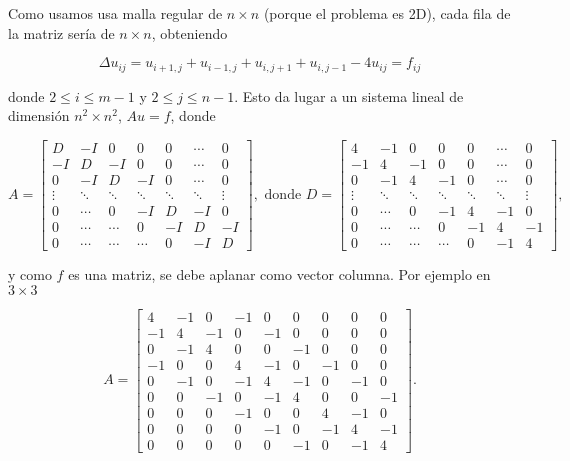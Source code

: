    Como usamos usa malla regular de $n \times n$ (porque el problema es  2D), cada fila de la matriz sería de $n\times n$, obteniendo

    \[
    \Delta u_{ij} =  u_{i+1, j} + u_{i-1, j} + u_{i, j+1} + u_{i, j-1} - 4 u_{ij} = f_{ij}
    \]

    donde \(2 \leq i \leq m-1\) y \(2 \leq j \leq n-1\). Esto da lugar a un sistema lineal de dimensión \(n^2 \times  n^2\),  $A u=f$, donde 

    $$
    A=\left[\begin{array}{ccccccc}
    D & -I & 0 & 0 & 0 & \cdots & 0 \\
    -I & D & -I & 0 & 0 & \cdots & 0 \\
    0 & -I & D & -I & 0 & \cdots & 0 \\
    \vdots & \ddots & \ddots & \ddots & \ddots & \ddots & \vdots \\
    0 & \cdots & 0 & -I & D & -I & 0 \\
    0 & \cdots & \cdots & 0 & -I & D & -I \\
    0 & \cdots & \cdots & \cdots & 0 & -I & D
    \end{array}\right], \text{ donde }  D=\left[\begin{array}{ccccccc}
    4 & -1 & 0 & 0 & 0 & \cdots & 0 \\
    -1 & 4 & -1 & 0 & 0 & \cdots & 0 \\
    0 & -1 & 4 & -1 & 0 & \cdots & 0 \\
    \vdots & \ddots & \ddots & \ddots & \ddots & \ddots & \vdots \\
    0 & \cdots & 0 & -1 & 4 & -1 & 0 \\
    0 & \cdots & \cdots & 0 & -1 & 4 & -1 \\
    0 & \cdots & \cdots & \cdots & 0 & -1 & 4
    \end{array}\right],
    $$

    y como $f$ es una matriz, se debe aplanar como vector columna. Por ejemplo en $3\times 3$

    $$
    A=\left[\begin{array}{ccc|ccc|ccc}
    4 & -1 & 0 & -1 & 0 & 0 & 0 & 0 & 0 \\
    -1 & 4 & -1 & 0 & -1 & 0 & 0 & 0 & 0 \\
    0 & -1 & 4 & 0 & 0 & -1 & 0 & 0 & 0 \\
    \hline-1 & 0 & 0 & 4 & -1 & 0 & -1 & 0 & 0 \\
    0 & -1 & 0 & -1 & 4 & -1 & 0 & -1 & 0 \\
    0 & 0 & -1 & 0 & -1 & 4 & 0 & 0 & -1 \\
    \hline 0 & 0 & 0 & -1 & 0 & 0 & 4 & -1 & 0 \\
    0 & 0 & 0 & 0 & -1 & 0 & -1 & 4 & -1 \\
    0 & 0 & 0 & 0 & 0 & -1 & 0 & -1 & 4
    \end{array}\right].
    $$

